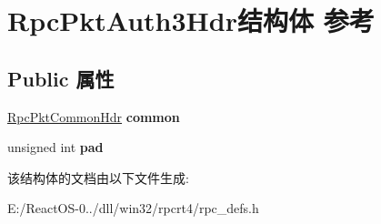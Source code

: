 \hypertarget{struct_rpc_pkt_auth3_hdr}{}\section{Rpc\+Pkt\+Auth3\+Hdr结构体 参考}
\label{struct_rpc_pkt_auth3_hdr}
\subsection*{Public 属性}
\begin{DoxyCompactItemize}
\item 
\mbox{\label{struct_rpc_pkt_auth3_hdr_a75999afdd40979d3f369f28d636383e3}} 
\hyperlink{struct_rpc_pkt_common_hdr}{Rpc\+Pkt\+Common\+Hdr} {\bfseries common}
\item 
\mbox{\label{struct_rpc_pkt_auth3_hdr_a07dbf6a3561af23d37987ccdd13e19da}} 
unsigned int {\bfseries pad}
\end{DoxyCompactItemize}


该结构体的文档由以下文件生成\+:\begin{DoxyCompactItemize}
\item 
E\+:/\+React\+O\+S-\/0../dll/win32/rpcrt4/rpc\+\_\+defs.\+h\end{DoxyCompactItemize}
